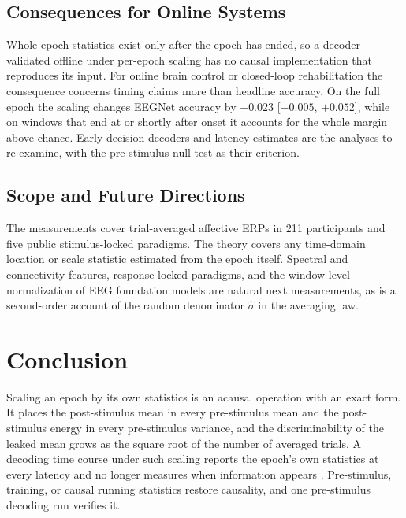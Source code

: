 \subsection{Consequences for Online Systems}
Whole-epoch statistics exist only after the epoch has ended, so a decoder validated offline under per-epoch scaling has no causal implementation that reproduces its input. For online brain control \cite{wang2025online} or closed-loop rehabilitation the consequence concerns timing claims more than headline accuracy. On the full epoch the scaling changes EEGNet accuracy by $+0.023$ [$-0.005$, $+0.052$], while on windows that end at or shortly after onset it accounts for the whole margin above chance. Early-decision decoders and latency estimates are the analyses to re-examine, with the pre-stimulus null test as their criterion.

\subsection{Scope and Future Directions}
The measurements cover trial-averaged affective ERPs in 211 participants and five public stimulus-locked paradigms. The theory covers any time-domain location or scale statistic estimated from the epoch itself. Spectral and connectivity features, response-locked paradigms, and the window-level normalization of EEG foundation models are natural next measurements, as is a second-order account of the random denominator $\hat\sigma$ in the averaging law.

\section{Conclusion}
Scaling an epoch by its own statistics is an acausal operation with an exact form. It places the post-stimulus mean in every pre-stimulus mean and the post-stimulus energy in every pre-stimulus variance, and the discriminability of the leaked mean grows as the square root of the number of averaged trials. A decoding time course under such scaling reports the epoch's own statistics at every latency and no longer measures when information appears \cite{grootswagers2017decoding,king2014temporal}. Pre-stimulus, training, or causal running statistics restore causality, and one pre-stimulus decoding run verifies it.
